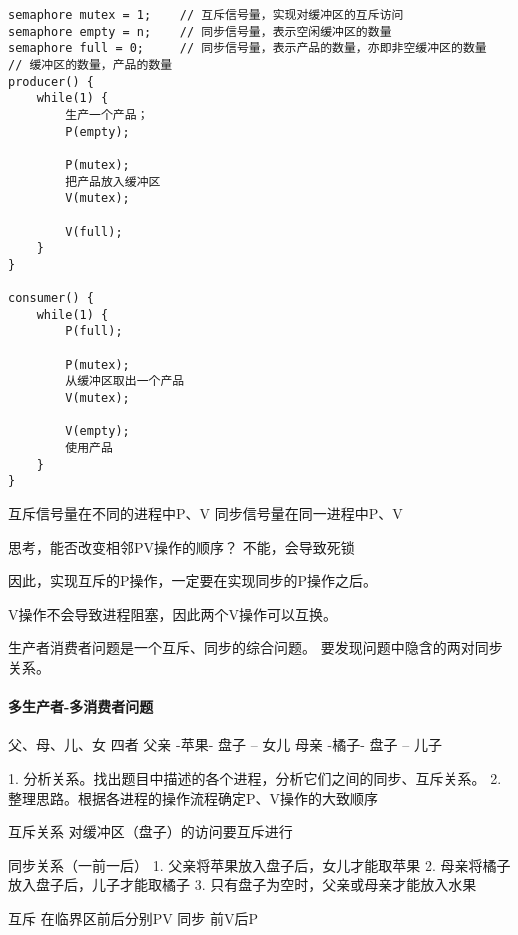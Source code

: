 \begin{lstlisting}
semaphore mutex = 1;	// 互斥信号量，实现对缓冲区的互斥访问
semaphore empty = n;	// 同步信号量，表示空闲缓冲区的数量
semaphore full = 0;		// 同步信号量，表示产品的数量，亦即非空缓冲区的数量
// 缓冲区的数量，产品的数量
producer() {
	while(1) {
		生产一个产品；
		P(empty);
		
		P(mutex);
		把产品放入缓冲区
		V(mutex);
		
		V(full);
	}
}

consumer() {
	while(1) {
		P(full);
		
		P(mutex);
		从缓冲区取出一个产品
		V(mutex);
		
		V(empty);
		使用产品
	}
}

\end{lstlisting}
互斥信号量在不同的进程中P、V
同步信号量在同一进程中P、V

思考，能否改变相邻PV操作的顺序？
不能，会导致死锁

因此，实现互斥的P操作，一定要在实现同步的P操作之后。

V操作不会导致进程阻塞，因此两个V操作可以互换。

生产者消费者问题是一个互斥、同步的综合问题。
要发现问题中隐含的两对同步关系。

\paragraph{多生产者-多消费者问题}
父、母、儿、女 四者
父亲 -苹果- 盘子 -- 女儿
母亲 -橘子- 盘子 -- 儿子
 
1. 分析关系。找出题目中描述的各个进程，分析它们之间的同步、互斥关系。
2. 整理思路。根据各进程的操作流程确定P、V操作的大致顺序

互斥关系
对缓冲区（盘子）的访问要互斥进行

同步关系（一前一后）
1. 父亲将苹果放入盘子后，女儿才能取苹果
2. 母亲将橘子放入盘子后，儿子才能取橘子
3. 只有盘子为空时，父亲或母亲才能放入水果

互斥 在临界区前后分别PV
同步 前V后P

